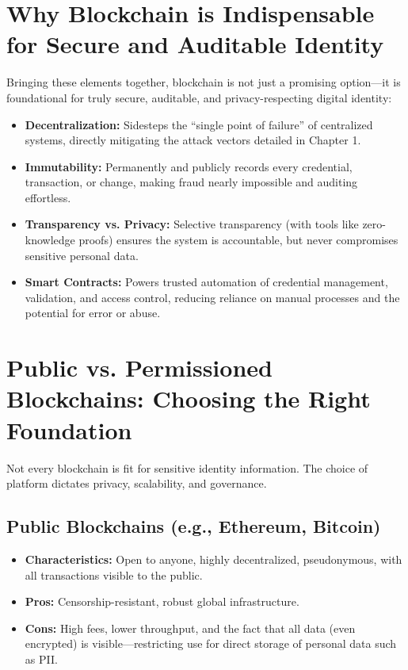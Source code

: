 \section{Why Blockchain is Indispensable for Secure and Auditable Identity}
Bringing these elements together, blockchain is not just a promising option—it is foundational for truly secure, auditable, and privacy-respecting digital identity:

\begin{itemize}
    \item \textbf{Decentralization:} Sidesteps the “single point of failure” of centralized systems, directly mitigating the attack vectors detailed in Chapter 1.
    \item \textbf{Immutability:} Permanently and publicly records every credential, transaction, or change, making fraud nearly impossible and auditing effortless.
    \item \textbf{Transparency vs. Privacy:} Selective transparency (with tools like zero-knowledge proofs) ensures the system is accountable, but never compromises sensitive personal data.
    \item \textbf{Smart Contracts:} Powers trusted automation of credential management, validation, and access control, reducing reliance on manual processes and the potential for error or abuse.
\end{itemize}

\section{Public vs. Permissioned Blockchains: Choosing the Right Foundation}
Not every blockchain is fit for sensitive identity information. The choice of platform dictates privacy, scalability, and governance.

\subsection*{Public Blockchains (e.g., Ethereum, Bitcoin)}
\begin{itemize}
    \item \textbf{Characteristics:} Open to anyone, highly decentralized, pseudonymous, with all transactions visible to the public.
    \item \textbf{Pros:} Censorship-resistant, robust global infrastructure.
    \item \textbf{Cons:} High fees, lower throughput, and the fact that all data (even encrypted) is visible—restricting use for direct storage of personal data such as PII.
\end{itemize}

